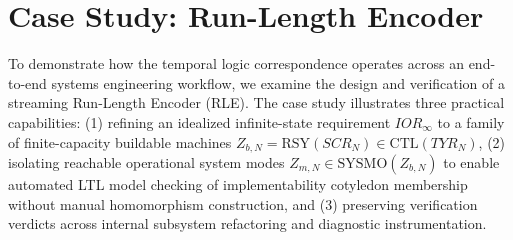 \section{Case Study: Run-Length Encoder}
\label{sec:case-study}

To demonstrate how the temporal logic correspondence operates across an end-to-end systems engineering workflow, we examine the design and verification of a streaming Run-Length Encoder (RLE). The case study illustrates three practical capabilities: (1) refining an idealized infinite-state requirement $IOR_\infty$ to a family of finite-capacity buildable machines $Z_{b,N}=\mathrm{RSY}(SCR_N)\in\mathrm{CTL}(TYR_N)$, (2) isolating reachable operational system modes $Z_{m,N}\in\mathrm{SYSMO}(Z_{b,N})$ to enable automated LTL model checking of implementability cotyledon membership without manual homomorphism construction, and (3) preserving verification verdicts across internal subsystem refactoring and diagnostic instrumentation.



